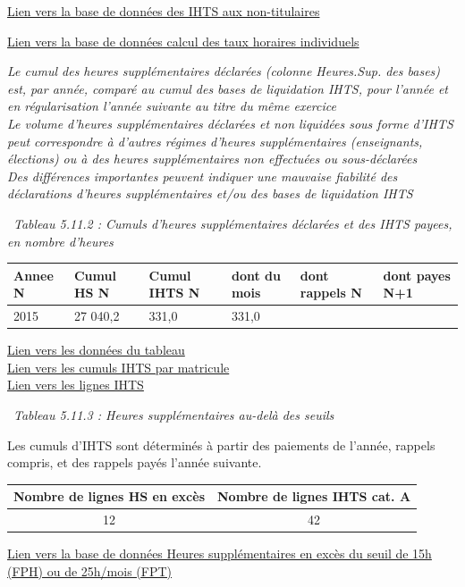 \href{../Bases/Reglementation/Base.IHTS.non.tit.csv}{Lien vers la base de
données des IHTS aux non-titulaires}

\href{../Bases/Reglementation/Taux.horaires.csv}{Lien vers la base de
données calcul des taux horaires individuels}

\emph{Le cumul des heures supplémentaires déclarées (colonne Heures.Sup.
des bases) est, par année, comparé au cumul des bases de liquidation
IHTS, pour l'année et en régularisation l'année suivante au titre du
même exercice}\\
\emph{Le volume d'heures supplémentaires déclarées et non liquidées sous
forme d'IHTS peut correspondre à d'autres régimes d'heures
supplémentaires (enseignants, élections) ou à des heures supplémentaires
non effectuées ou sous-déclarées}\\
\emph{Des différences importantes peuvent indiquer une mauvaise
fiabilité des déclarations d'heures supplémentaires et/ou des bases de
liquidation IHTS}

~\emph{Tableau 5.11.2 : Cumuls d'heures supplémentaires déclarées et des
IHTS payees, en nombre d'heures}

\begin{longtable}[]{@{}llllll@{}}
\toprule
Annee N & Cumul HS N & Cumul IHTS N & dont du mois & dont rappels N &
dont payes N+1\tabularnewline
\midrule
\endhead
2015 & 27 040,2 & 331,0 & 331,0 & &\tabularnewline
\bottomrule
\end{longtable}

\href{../Bases/Reglementation/CumHS.csv}{Lien vers les données du
tableau}\\
\href{../Bases/Reglementation/lignes.IHTS.tot.csv}{Lien vers les cumuls
IHTS par matricule}\\
\href{../Bases/Reglementation/lignes.IHTS.csv}{Lien vers les lignes IHTS}

~\emph{Tableau 5.11.3 : Heures supplémentaires au-delà des seuils}

Les cumuls d'IHTS sont déterminés à partir des paiements de l'année,
rappels compris, et des rappels payés l'année suivante.

\begin{longtable}[]{@{}cc@{}}
\toprule
Nombre de lignes HS en excès & Nombre de lignes IHTS cat.
A\tabularnewline
\midrule
\endhead
12 & 42\tabularnewline
\bottomrule
\end{longtable}

\href{../Bases/Reglementation/HS.sup.25.csv}{Lien vers la base de données
Heures supplémentaires en excès du seuil de 15h (FPH) ou de 25h/mois
(FPT)}

